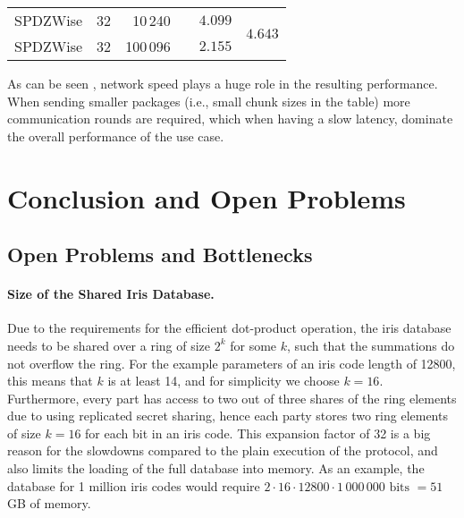 \documentclass[a4paper,11pt,
]{article}
\newcommand{\cmark}{\ding{51}}%
\begin{document}
\begin{table}[ht]
\begin{tabular}{lrrcrr}
        SPDZWise                     & 32                          & 10\,240                        & \cmark                        & $4.099$                     & \multirow{2}{*}{$4.643$} \\
        SPDZWise                     & 32                          & 100\,096                       & \cmark                        & $2.155$                     &                          \\
        \bottomrule
    \end{tabular}
\end{table}


As can be seen , network speed plays a huge role in the resulting performance. When sending smaller packages (i.e., small chunk sizes in the table) more communication rounds are required, which when having a slow latency, dominate the overall performance of the use case.

\section{Conclusion and Open Problems}

\subsection{Open Problems and Bottlenecks}

\paragraph{Size of the Shared Iris Database.}
Due to the requirements for the efficient dot-product operation, the iris database needs to be shared over a ring of size $2^k$ for some $k$, such that the summations do not overflow the ring.
For the example parameters of an iris code length of 12800, this means that $k$ is at least 14, and for simplicity we choose $k=16$.
Furthermore, every part has access to two out of three shares of the ring elements due to using replicated secret sharing, hence each party stores two ring elements of size $k=16$ for each bit in an iris code.
This expansion factor of 32 is a big reason for the slowdowns compared to the plain execution of the protocol, and also limits the loading of the full database into memory. As an example, the database for 1 million iris codes would require $2 \cdot 16 \cdot 12800 \cdot 1\,000\,000 \text{ bits } = 51$ GB of memory.
\end{document}
